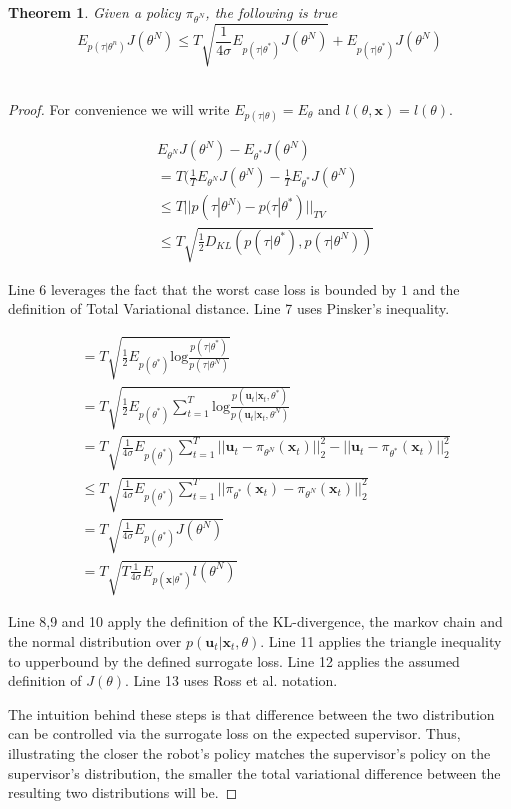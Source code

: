 \documentclass[10pt, conference]{ieeeconf}      %
\newtheorem{theorem}{Theorem}[section]
\newcommand{\bu}{\mathbf{u}}
\newcommand{\bx}{\mathbf{x}}
\begin{document}
\begin{theorem}
Given a policy $\pi_{\theta^N}$, the following is true 
$$E_{p(\tau|\theta^n)} J(\theta^N) \leq T\sqrt{\frac{1}{4\sigma}E_{p(\tau|\theta^*)} J(\theta^N)}+E_{p(\tau|\theta^*)} J(\theta^N)$$\\
\end{theorem}
\begin{proof}
For convenience we will write $E_{p(\tau|\theta)} = E_{\theta}$ and $l(\theta,\bx) = l(\theta)$. 

\begin{align}
&E_{\theta^N} J(\theta^N) - E_{\theta^*} J(\theta^N) \\
&= T(\frac{1}{T}E_{\theta^N} J(\theta^N) -\frac{1}{T}E_{\theta^*} J(\theta^N)\\
&\leq  T| | p(\tau|\theta^N) - p(\tau|\theta^*)||_{TV}\\
&\leq T\sqrt{\frac{1}{2} D_{KL}(p(\tau|\theta^*),p(\tau|\theta^N))}
\end{align}

 Line 6 leverages the fact that the worst case loss is bounded by $1$ and the definition of Total Variational distance. Line 7 uses Pinsker's inequality. 


\begin{align}
&= T\sqrt{\frac{1}{2} E_{p(\theta^*)} \mbox{log} \frac{p(\tau|\theta^*)}{p(\tau|\theta^N)}}\\
&= T\sqrt{\frac{1}{2} E_{p(\theta^*)} \sum^T_{t=1}\mbox{log} \frac{p(\bu_t|\bx_t,\theta^*)}{p(\bu_t|\bx_t,\theta^N)}}\\
&= T\sqrt{\frac{1}{4\sigma} E_{p(\theta^*)} \sum^T_{t=1} ||\bu_t- \pi_{\theta^N}(\bx_t)||_2^2 - ||\bu_t- \pi_{\theta^*}(\bx_t)||_2^2}\\
&\leq T\sqrt{\frac{1}{4\sigma} E_{p(\theta^*)} \sum^T_{t=1}  ||\pi_{\theta^*}(\bx_t) - \pi_{\theta^N}(\bx_t)||_2^2}\\
&= T\sqrt{\frac{1}{4\sigma} E_{p(\theta^*)} J(\theta^N)}\\
&= T\sqrt{T \frac{1}{4\sigma} E_{p(\bx|\theta^*)} l(\theta^N)}
\end{align}

Line 8,9 and 10 apply the definition of the KL-divergence, the markov chain and the normal distribution over $p(\bu_t|\bx_t,\theta)$. Line 11 applies the triangle inequality to upperbound by the defined surrogate loss. Line 12 applies the assumed definition of $J(\theta)$. Line 13 uses Ross et al. notation. 

The intuition behind these steps is that difference between  the two distribution can be controlled via the surrogate loss on the expected supervisor. Thus, illustrating the closer the robot's policy matches the supervisor's policy on the supervisor's distribution, the smaller the total variational difference between the resulting two distributions will be. 
\end{proof}
  
\end{document}
